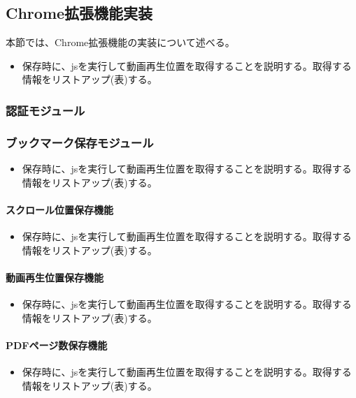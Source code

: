 \subsection{Chrome拡張機能実装}
本節では、Chrome拡張機能の実装について述べる。
\begin{itemize}
  \item 保存時に、jsを実行して動画再生位置を取得することを説明する。取得する情報をリストアップ(表)する。
\end{itemize}

\subsubsection{認証モジュール}

\subsubsection{ブックマーク保存モジュール}
\begin{itemize}
  \item 保存時に、jsを実行して動画再生位置を取得することを説明する。取得する情報をリストアップ(表)する。
\end{itemize}

\paragraph{スクロール位置保存機能}
\begin{itemize}
  \item 保存時に、jsを実行して動画再生位置を取得することを説明する。取得する情報をリストアップ(表)する。
\end{itemize}

\paragraph{動画再生位置保存機能}
\begin{itemize}
  \item 保存時に、jsを実行して動画再生位置を取得することを説明する。取得する情報をリストアップ(表)する。
\end{itemize}

\paragraph{PDFページ数保存機能}
\begin{itemize}
  \item 保存時に、jsを実行して動画再生位置を取得することを説明する。取得する情報をリストアップ(表)する。
\end{itemize}

